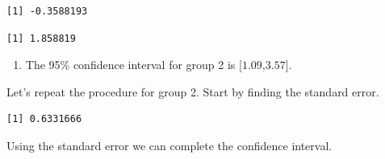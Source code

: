 \documentclass[
  letterpaper,
  DIV=11,
  numbers=noendperiod]{scrreprt}
\newenvironment{Shaded}{\begin{snugshade}}{\end{snugshade}}
\newcommand{\DecValTok}[1]{\textcolor[rgb]{0.68,0.00,0.00}{#1}}
\newcommand{\FloatTok}[1]{\textcolor[rgb]{0.68,0.00,0.00}{#1}}
\newcommand{\FunctionTok}[1]{\textcolor[rgb]{0.28,0.35,0.67}{#1}}
\newcommand{\NormalTok}[1]{\textcolor[rgb]{0.00,0.23,0.31}{#1}}
\newcommand{\OtherTok}[1]{\textcolor[rgb]{0.00,0.23,0.31}{#1}}
\newcommand{\SpecialCharTok}[1]{\textcolor[rgb]{0.37,0.37,0.37}{#1}}
\providecommand{\tightlist}{%
  \setlength{\itemsep}{0pt}\setlength{\parskip}{0pt}}\usepackage{longtable,booktabs,array}
\begin{document}
\begin{verbatim}
[1] -0.3588193
\end{verbatim}

\begin{Shaded}
\end{Shaded}

\begin{verbatim}
[1] 1.858819
\end{verbatim}

\begin{blackbox}

\begin{enumerate}
\def\labelenumi{\arabic{enumi}.}
\setcounter{enumi}{1}
\tightlist
\item
  The 95\% confidence interval for group 2 is {[}\(1.09\),\(3.57\){]}.
\end{enumerate}

\end{blackbox}

Let's repeat the procedure for group 2. Start by finding the standard
error.

\begin{Shaded}
\end{Shaded}

\begin{verbatim}
[1] 0.6331666
\end{verbatim}

Using the standard error we can complete the confidence interval.

\begin{Shaded}
\end{Shaded}
\end{document}
